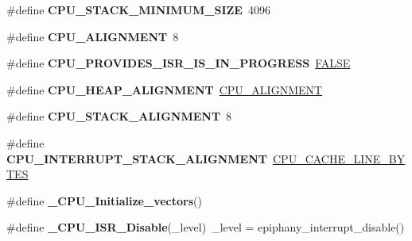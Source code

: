 \begin{DoxyCompactItemize}
\mbox{\label{group__RTEMSScoreCPUEpiphany_ga4c92ceea7549cc7b21db2c466916b733}} 
\#define {\bfseries C\+P\+U\+\_\+\+S\+T\+A\+C\+K\+\_\+\+M\+I\+N\+I\+M\+U\+M\+\_\+\+S\+I\+ZE}~4096
\item 
\mbox{\label{group__RTEMSScoreCPUEpiphany_gae526a309e32001688261048b19cdb7d8}} 
\#define {\bfseries C\+P\+U\+\_\+\+A\+L\+I\+G\+N\+M\+E\+NT}~8
\item 
\mbox{\label{group__RTEMSScoreCPUEpiphany_ga47f6e4d60c72b5f65fc775b0b5dd14ec}} 
\#define {\bfseries C\+P\+U\+\_\+\+P\+R\+O\+V\+I\+D\+E\+S\+\_\+\+I\+S\+R\+\_\+\+I\+S\+\_\+\+I\+N\+\_\+\+P\+R\+O\+G\+R\+E\+SS}~\mbox{\hyperlink{group__RTEMSScoreBaseDefs_gaa93f0eb578d23995850d61f7d61c55c1}{F\+A\+L\+SE}}
\item 
\mbox{\label{group__RTEMSScoreCPUEpiphany_gac71c1e0159c32144a04f18646ede252b}} 
\#define {\bfseries C\+P\+U\+\_\+\+H\+E\+A\+P\+\_\+\+A\+L\+I\+G\+N\+M\+E\+NT}~\mbox{\hyperlink{v850_2include_2rtems_2score_2cpu_8h_ae526a309e32001688261048b19cdb7d8}{C\+P\+U\+\_\+\+A\+L\+I\+G\+N\+M\+E\+NT}}
\item 
\mbox{\label{group__RTEMSScoreCPUEpiphany_ga8aed43eb1b3c346772c127482b4b5372}} 
\#define {\bfseries C\+P\+U\+\_\+\+S\+T\+A\+C\+K\+\_\+\+A\+L\+I\+G\+N\+M\+E\+NT}~8
\item 
\mbox{\label{group__RTEMSScoreCPUEpiphany_ga6a578627686e1020a28f5a295703ca74}} 
\#define {\bfseries C\+P\+U\+\_\+\+I\+N\+T\+E\+R\+R\+U\+P\+T\+\_\+\+S\+T\+A\+C\+K\+\_\+\+A\+L\+I\+G\+N\+M\+E\+NT}~\mbox{\hyperlink{no__cpu_2include_2rtems_2score_2cpu_8h_aafa1399e268a9ae6adf6d6aad4371688}{C\+P\+U\+\_\+\+C\+A\+C\+H\+E\+\_\+\+L\+I\+N\+E\+\_\+\+B\+Y\+T\+ES}}
\item 
\mbox{\label{group__RTEMSScoreCPUEpiphany_gad1ef5062849284d81496e1e6d33fb7ff}} 
\#define {\bfseries \+\_\+\+C\+P\+U\+\_\+\+Initialize\+\_\+vectors}()
\item 
\mbox{\label{group__RTEMSScoreCPUEpiphany_gabc05c31eff429870b8564553d9eae054}} 
\#define {\bfseries \+\_\+\+C\+P\+U\+\_\+\+I\+S\+R\+\_\+\+Disable}(\+\_\+level)~\+\_\+level = epiphany\+\_\+interrupt\+\_\+disable()

\end{DoxyCompactItemize}
